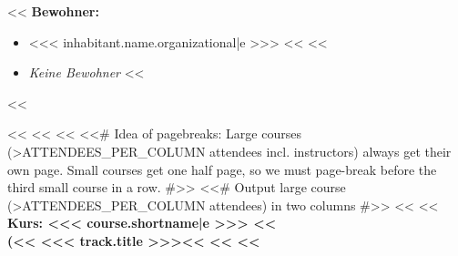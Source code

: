         \setlength{\columnsep}{2cm}
        \begin{minipage}[t]{0.5\textwidth}
            <<%
                {
                    \headingfamily\bfseries Bewohner:
                }
                \begin{itemize}
                    <<%
                            if inhabitant.parts[part].status == ENUMS.RegistrationPartStati.participant -%
                        \item <<< inhabitant.name.organizational|e >>>
                            <<%
                    <<%
                        \item \textit{Keine Bewohner}
                    <<%
                \end{itemize}
            <<%
        \end{minipage}%
        <<%
        <<%
            <<%
            <<# Idea of pagebreaks: Large courses (>ATTENDEES_PER_COLUMN attendees incl. instructors) always get their
                own page. Small courses get one half page, so we must page-break before the third small course in a row.
                #>>
            <<# Output large course (>ATTENDEES_PER_COLUMN attendees) in two columns #>>
            <<%
                <<%
                {\headingfamily\bfseries
                    Kurs: <<< course.shortname|e >>>
                    <<%
                        \\\mdseries
                        (<<%
                            <<< track.title >>><<%
                         <<%
                    <<%
                    \vspace{0.6\baselineskip}
                }

